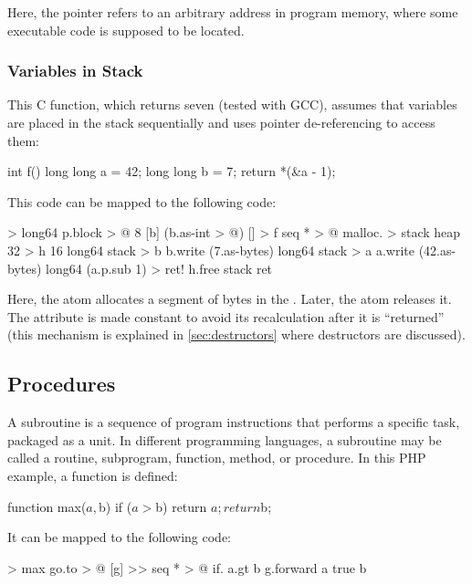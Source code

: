 \documentclass[sigplan,nonacm]{acmart}
\begin{document}
Here, the pointer refers to an arbitrary address in program memory, where some executable code is supposed to be located.

\subsubsection{Variables in Stack}

This C function, which returns seven (tested with GCC), assumes that variables are placed in the stack sequentially and uses pointer de-referencing to access them:

\begin{ffcode}
int f() {
  long long a = 42;
  long long b = 7;
  return *(&a - 1);
}
\end{ffcode}

This code can be mapped to the following \eolang{} code:

\begin{ffcode}
[p] > long64
  p.block > @
    8
    [b] (b.as-int > @)
[] > f
  seq * > @
    malloc. > stack
      heap 32 > h
      16
    long64 stack > b
    b.write (7.as-bytes)
    long64 stack > a
    a.write (42.as-bytes)
    long64 (a.p.sub 1) > ret!
    h.free stack
    ret
\end{ffcode}

Here, the atom  allocates a segment of bytes in the . Later, the atom  releases it. The attribute  is made constant to avoid its recalculation after it is ``returned'' (this mechanism is explained in \cref{sec:destructors} where destructors are discussed).

\subsection{Procedures}
\label{sec:procedures}

A subroutine is a sequence of program instructions that performs a specific task, packaged as a unit. In different programming languages, a subroutine may be called a routine, subprogram, function, method, or procedure. In this PHP example, a function  is defined:

\begin{ffcode}
function max($a, $b) {
  if ($a > $b) return $a;
  return $b;
}
\end{ffcode}

It can be mapped to the following \eolang{} code:

\begin{ffcode}
[a b] > max
  go.to > @
    [g] >>
      seq * > @
        if.
          a.gt b
          g.forward a
          true
        b
\end{ffcode}
\end{document}
